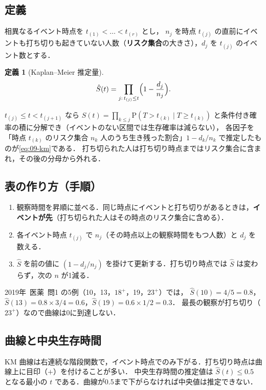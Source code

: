 \documentclass[a4paper,11pt,openany]{ltjsbook}
\newtheorem{teigi}{定義}[chapter]
\newcommand{\kakomon}[2]{\mbox{#1年 医薬 問#2}}
\newcommand{\Prob}{\mathrm{P}}
\newcommand{\emphx}[1]{\textbf{\textcolor{bkblue}{#1}}}
\begin{document}
\subsection{定義}
相異なるイベント時点を $t_{(1)}<\dots<t_{(r)}$ とし，
$n_j$ を時点 $t_{(j)}$ の直前にイベントも打ち切りも起きていない人数（\emphx{リスク集合}の大きさ），$d_j$ を $t_{(j)}$ のイベント数とする．
\begin{teigi}[Kaplan--Meier 推定量]\label{def:09-km}
\begin{equation}
\hat S(t)=\prod_{j:\,t_{(j)}\le t}\Bigl(1-\frac{d_j}{n_j}\Bigr).\label{eq:09-km}
\end{equation}
\end{teigi}
$t_{(j)}\le t<t_{(j+1)}$ なら $S(t)=\prod_{k\le j}\Prob(T>t_{(k)}\mid T\ge t_{(k)})$ と条件付き確率の積に分解でき（イベントのない区間では生存確率は減らない），
各因子を「時点 $t_{(k)}$ のリスク集合 $n_k$ 人のうち生き残った割合」$1-d_k/n_k$ で推定したものが\cref{eq:09-km}である．
打ち切られた人は打ち切り時点まではリスク集合に含まれ，その後の分母から外れる．

\subsection{表の作り方（手順）}
\begin{enumerate}
\item 観察時間を昇順に並べる．同じ時点にイベントと打ち切りがあるときは，\textbf{イベントが先}（打ち切られた人はその時点のリスク集合に含める）．
\item 各イベント時点 $t_{(j)}$ で $n_j$（その時点以上の観察時間をもつ人数）と $d_j$ を数える．
\item $\hat S$ を前の値に $(1-d_j/n_j)$ を掛けて更新する．打ち切り時点では $\hat S$ は変わらず，次の $n$ が1減る．
\end{enumerate}
\kakomon{2019}{1} の5例（10，13，$18^+$，19，$23^+$）では，
$\hat S(10)=4/5=0.8$，$\hat S(13)=0.8\times3/4=0.6$，$\hat S(19)=0.6\times1/2=0.3$．
最長の観察が打ち切り（$23^+$）なので曲線は0に到達しない．

\subsection{曲線と中央生存時間}
KM 曲線は右連続な階段関数で，イベント時点でのみ下がる．打ち切り時点は曲線上に目印（$+$）を付けることが多い．
中央生存時間の推定値は $\hat S(t)\le0.5$ となる最小の $t$ である．曲線が0.5まで下がらなければ中央値は推定できない．
\end{document}
